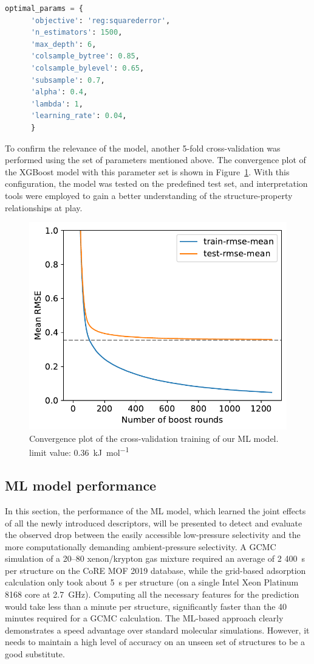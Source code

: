 \documentclass[main]{subfiles}
\begin{document}
\begin{lstlisting}[language=Python]
  optimal_params = {
      'objective': 'reg:squarederror',
      'n_estimators': 1500,
      'max_depth': 6,
      'colsample_bytree': 0.85,
      'colsample_bylevel': 0.65,
      'subsample': 0.7,
      'alpha': 0.4,
      'lambda': 1,
      'learning_rate': 0.04,
      }
  \end{lstlisting}

To confirm the relevance of the model, another 5-fold cross-validation was performed using the set of parameters mentioned above. The convergence plot of the XGBoost model with this parameter set is shown in Figure~\ref{fgr:convplot}. With this configuration, the model was tested on the predefined test set, and interpretation tools were employed to gain a better understanding of the structure-property relationships at play.

\begin{figure}[ht]
  \centering
    \includegraphics[width=0.60\linewidth]{figures/4-ml/SI_figure/convergence_plot.pdf}
    \caption{Convergence plot of the cross-validation training of our ML model. limit value: 0.36~\si{\kilo\joule\per\mole}}\label{fgr:convplot}
  \end{figure}

\subsection{ML model performance}

In this section, the performance of the ML model, which learned the joint effects of all the newly introduced descriptors, will be presented to detect and evaluate the observed drop between the easily accessible low-pressure selectivity and the more computationally demanding ambient-pressure selectivity. A GCMC simulation of a 20–80 xenon/krypton gas mixture required an average of 2 400~\si{\second} per structure on the CoRE MOF 2019 database, while the grid-based adsorption calculation only took about \SI{5}{\second} per structure (on a single Intel Xeon Platinum 8168 core at \SI{2.7}{\giga\hertz}). Computing all the necessary features for the prediction would take less than a minute per structure, significantly faster than the 40 minutes required for a GCMC calculation. The ML-based approach clearly demonstrates a speed advantage over standard molecular simulations. However, it needs to maintain a high level of accuracy on an unseen set of structures to be a good substitute.
\end{document}
